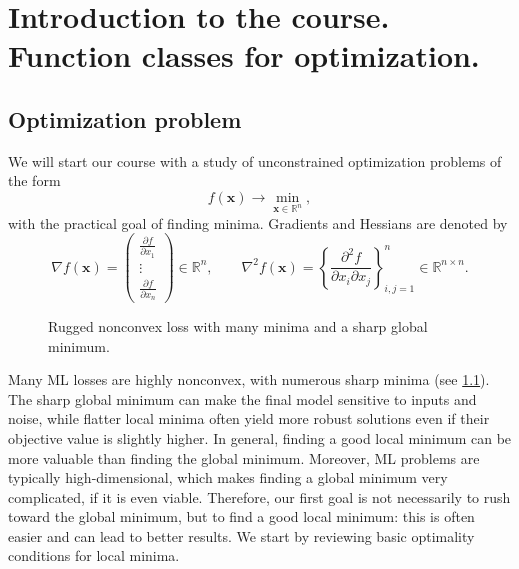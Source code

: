 \chapter{Introduction to the course. Function classes for optimization.}

\graphicspath{{chapters/01_introduction/figures}}
\begin{abstract}
We summarize first-order and second-order conditions for local minima, 
recall differential notation, discuss error sources in numerical 
differentiation, and collect basic convexity, strong convexity, and 
Lipschitz smoothness facts that will be used throughout the course.
\end{abstract}

\section{Optimization problem}
We will start our course with a study of unconstrained optimization problems 
of the form
\[
  f(\mathbf{x}) \rightarrow \min_{\mathbf{x} \in \mathbb{R}^{n}},
\]
with the practical goal of finding minima. Gradients and Hessians
are denoted by
\[
\nabla f(\mathbf{x})=\begin{pmatrix} \frac{\partial f}{\partial x_1}\\ \vdots\\
\frac{\partial f}{\partial x_n} \end{pmatrix} \in \mathbb{R}^{n }, \qquad
\nabla^{2} f(\mathbf{x})=\left\{\frac{\partial^{2} f}{\partial x_{i}\partial x_{j}}
\right\}_{i, j=1}^{n} \in \mathbb{R}^{n \times n} .
\]

\begin{figure}[ht]
    \centering
    \caption{Rugged nonconvex loss with many minima and a sharp 
    global minimum.}
    \label{fig:global-and-flat-local-minima}
\end{figure}

\noindent Many ML losses are highly nonconvex, with numerous sharp minima
(see \cref{fig:global-and-flat-local-minima}). The sharp global minimum can make the final
model sensitive to inputs and noise, while flatter local minima often yield more robust
solutions even if their objective value is slightly higher. In general, finding a good
local minimum can be more valuable than finding the global minimum. Moreover, ML
problems are typically high-dimensional, which makes finding a global minimum very
complicated, if it is even viable. Therefore, our first goal is not necessarily to rush
toward the global minimum, but to find a good local minimum: this is often easier and
can lead to better results. We start by reviewing basic optimality conditions for local minima.

